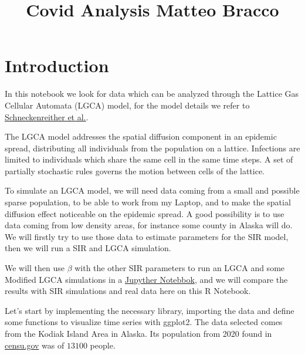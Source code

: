 \documentclass[
]{article}
\title{Covid Analysis Matteo Bracco}
\author{}
\date{\vspace{-2.5em}}
\begin{document}
\maketitle

\section{Introduction}\label{introduction}

In this notebook we look for data which can be analyzed through the
Lattice Gas Cellular Automata (LGCA) model, for the model details we
refer to
\href{https://doi.org/10.1016/j.simpat.2008.05.015}{Schneckenreither et
al.}.

The LGCA model addresses the spatial diffusion component in an epidemic
spread, distributing all individuals from the population on a lattice.
Infections are limited to individuals which share the same cell in the
same time steps. A set of partially stochastic rules governs the motion
between cells of the lattice.

To simulate an LGCA model, we will need data coming from a small and
possible sparse population, to be able to work from my Laptop, and to
make the spatial diffusion effect noticeable on the epidemic spread. A
good possibility is to use data coming from low density areas, for
instance some county in Alaska will do. We will firstly try to use those
data to estimate parameters for the SIR model, then we will run a SIR
and LGCA simulation.

We will then use \(\beta\) with the other SIR parameters to run an LGCA
and some Modified LGCA simulations in a
\href{./Covid_Bracco.ipynb}{Jupyther Notebbok}, and we will compare the
results with SIR simulations and real data here on this R Notebook.

Let's start by implementing the necessary library, importing the data
and define some functions to visualize time series with ggplot2. The
data selected comes from the Kodiak Island Area in Alaska. Its
population from 2020 found in \href{https://www.census.gov}{censu.gov}
was of \(13100\) people.
\end{document}
